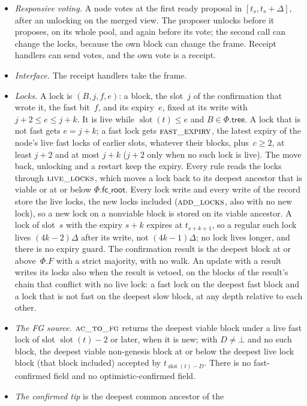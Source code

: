 \documentclass{article}
\newcommand{\slot}{\operatorname{slot}}
\newcommand{\Fr}{\Phi}
\newcommand{\tree}{\mathsf{tree}}
\newcommand{\fcroot}{\mathsf{fc\_root}}
\newcommand{\fname}[1]{\text{\textsc{#1}}}
\begin{document}
\begin{itemize}
\item[(P3)] \emph{Responsive voting.}  A node votes at the first ready
  proposal in $[t_s,t_s+\Delta]$, after an unlocking on the merged view.
  The proposer unlocks before it proposes, on its whole pool, and again
  before its vote; the second call can change the locks, because the own
  block can change the frame.  Receipt handlers can send votes, and the
  own vote is a receipt.
\item[(P4)] \emph{Interface.}  The receipt handlers take the frame.
\item[(P5)] \emph{Locks.}  A lock is $(B,j,f,e)$: a block, the slot~$j$ of
  the confirmation that wrote it, the fast bit~$f$, and its expiry~$e$,
  fixed at its write with $j+2\leq e\leq j+k$.  It is live while
  $\slot(t)\leq e$ and $B\in\Fr.\tree$.  A lock that is not fast gets
  $e=j+k$; a fast lock gets $\fname{fast\_expiry}$, the latest expiry of
  the node's live fast locks of earlier slots, whatever their blocks,
  plus~$c\geq2$, at least $j+2$ and at most $j+k$ ($j+2$ only when no such
  lock is live).  The move back, unlocking and
  a restart keep the expiry.
  Every rule reads the locks through $\fname{live\_locks}$, which moves a
  lock back to its deepest ancestor that is viable or at or below
  $\Fr.\fcroot$.  Every lock write and every write of the record store
  the live locks, the new locks included ($\fname{add\_locks}$, also with
  no new lock), so a new lock on a nonviable block is stored on its viable
  ancestor.  A
  lock of slot~$s$ with the expiry $s+k$ expires at $t_{s+k+1}$, so a
  regular such lock lives $(4k-2)\Delta$ after its write, not
  $(4k-1)\Delta$; no lock lives longer, and there is no expiry guard.  The confirmation result is the deepest block at or
  above~$\Fr.F$ with a strict majority, with no walk.  An update with a
  result writes its locks also when the result is vetoed, on the blocks
  of the result's chain that conflict with no live lock: a fast lock on
  the deepest fast block and a lock that is not fast on the deepest slow
  block, at any depth relative to each other.
\item[(P6)] \emph{The FG source.}  $\fname{ac\_to\_fg}$ returns the
  deepest viable block under a live fast lock of slot $\slot(t)-2$ or
  later, when it is new; with $D\neq\bot$ and no such block, the deepest
  viable non-genesis block at or below the deepest live lock block (that
  block included) accepted by $t_{\slot(t)-D}$.  There is no fast-confirmed
  field and no optimistic-confirmed field.
\item[(P7)] \emph{The confirmed tip} is the deepest common ancestor of the

\end{itemize}
\end{document}
